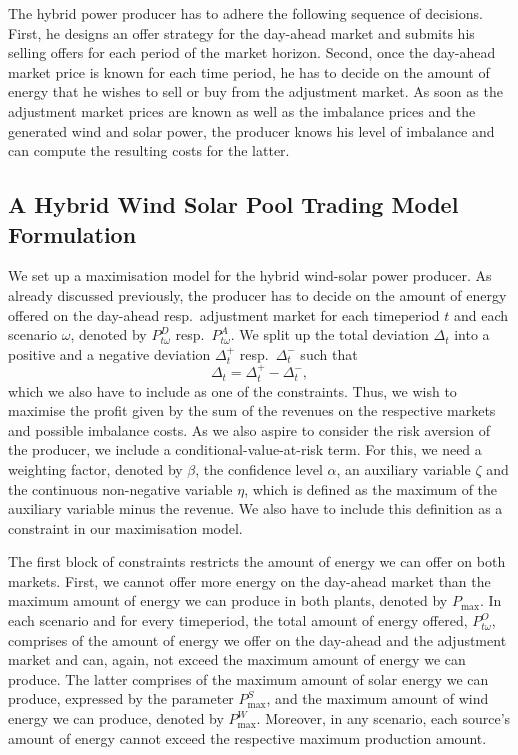 The hybrid power producer has to adhere the following sequence of decisions. First, he designs an offer strategy for the day-ahead market and submits his selling offers for each period of the market horizon. Second, once the day-ahead market price is known for each time period, he has to decide on the amount of energy that he wishes to sell or buy from the adjustment market. As soon as the adjustment market prices are known as well as the imbalance prices and the generated wind and solar power, the producer knows his level of imbalance and can compute the resulting costs for the latter.



\subsection{ A Hybrid Wind Solar Pool Trading Model Formulation}
We set up a maximisation model for the hybrid wind-solar power producer. As already discussed previously, the producer has to decide on the amount of energy offered on the day-ahead resp.\ adjustment market for each timeperiod $t$ and each scenario $\omega$, denoted by $P^{D}_{t \omega}$ resp.\ $P^{A}_{t \omega}$. We split up the total deviation $\Delta_{t}$ into a positive and a negative deviation $\Delta_{t}^{+}$ resp.\ $\Delta_{t}^{-}$ such that
\begin{equation*}
	\Delta_{t}=\Delta_{t}^{+}-\Delta_{t}^{-},
\end{equation*}
which we also have to include as one of the constraints. Thus, we wish to maximise the profit given by the sum of the revenues on the respective markets and possible imbalance costs. As we also aspire to consider the risk aversion of the producer, we include a conditional-value-at-risk term. For this, we need a weighting factor, denoted by $\beta$, the confidence level $\alpha$, an auxiliary variable $\zeta$ and the continuous non-negative variable $\eta$, which is defined as the maximum of the auxiliary variable minus the revenue. We also have to include this definition as a constraint in our maximisation model. 

The first block of constraints restricts the amount of energy we can offer on both markets. First, we cannot offer more energy on the day-ahead market than the maximum amount of energy we can produce in both plants, denoted by $P_{\max}$. In each scenario and for every timeperiod, the total amount of energy offered, $P^{O}_{t \omega}$, comprises of the amount of energy we offer on the day-ahead and the adjustment market and can, again, not exceed the maximum amount of energy we can produce. The latter comprises of the maximum amount of solar energy we can produce, expressed by the parameter $P_{\max}^{S}$, and the maximum amount of wind energy we can produce, denoted by $P_{\max}^{W}$. Moreover, in any scenario, each source's amount of energy cannot exceed the respective maximum production amount. 

